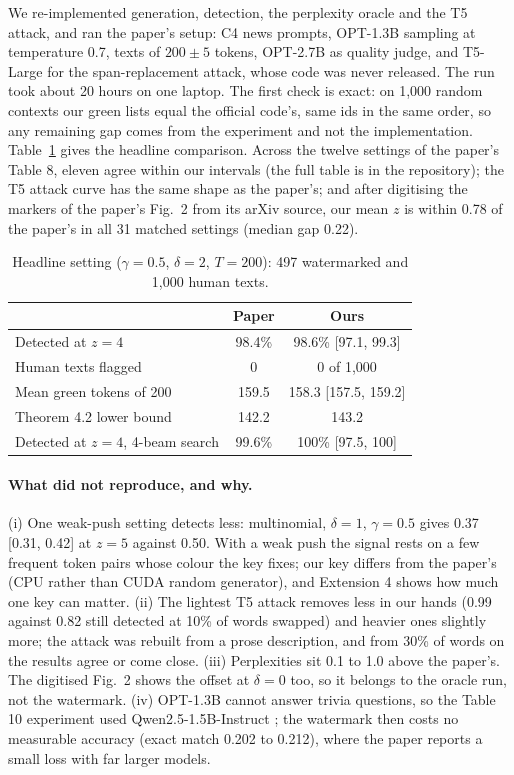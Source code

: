 \documentclass[12pt,letterpaper]{article}
\begin{document}
We re-implemented generation, detection, the perplexity oracle and the T5 attack, and ran the paper's setup: C4 news prompts, OPT-1.3B \citep{zhang2022opt} sampling at temperature 0.7, texts of $200 \pm 5$ tokens, OPT-2.7B as quality judge, and T5-Large \citep{raffel2020t5} for the span-replacement attack, whose code was never released. The run took about 20 hours on one laptop. The first check is exact: on 1,000 random contexts our green lists equal the official code's, same ids in the same order, so any remaining gap comes from the experiment and not the implementation. Table~\ref{tab:headline} gives the headline comparison. Across the twelve settings of the paper's Table 8, eleven agree within our intervals (the full table is in the repository); the T5 attack curve has the same shape as the paper's; and after digitising the markers of the paper's Fig.~2 from its arXiv source, our mean $z$ is within 0.78 of the paper's in all 31 matched settings (median gap 0.22).

\begin{table}[htbp]
\centering\singlespacing\small
\caption{Headline setting ($\gamma = 0.5$, $\delta = 2$, $T = 200$): 497 watermarked and 1,000 human texts.}
\label{tab:headline}
\begin{tabular}{lcc}
\toprule
 & Paper & Ours \\
\midrule
Detected at $z = 4$ & 98.4\% & 98.6\% [97.1, 99.3] \\
Human texts flagged & 0 & 0 of 1,000 \\
Mean green tokens of 200 & 159.5 & 158.3 [157.5, 159.2] \\
Theorem 4.2 lower bound & 142.2 & 143.2 \\
Detected at $z = 4$, 4-beam search & 99.6\% & 100\% [97.5, 100] \\
\bottomrule
\end{tabular}
\end{table}

\paragraph{What did not reproduce, and why.} (i) One weak-push setting detects less: multinomial, $\delta = 1$, $\gamma = 0.5$ gives 0.37 [0.31, 0.42] at $z = 5$ against 0.50. With a weak push the signal rests on a few frequent token pairs whose colour the key fixes; our key differs from the paper's (CPU rather than CUDA random generator), and Extension 4 shows how much one key can matter. (ii) The lightest T5 attack removes less in our hands (0.99 against 0.82 still detected at 10\% of words swapped) and heavier ones slightly more; the attack was rebuilt from a prose description, and from 30\% of words on the results agree or come close. (iii) Perplexities sit 0.1 to 1.0 above the paper's. The digitised Fig.~2 shows the offset at $\delta = 0$ too, so it belongs to the oracle run, not the watermark. (iv) OPT-1.3B cannot answer trivia questions, so the Table 10 experiment used Qwen2.5-1.5B-Instruct \citep{qwen2025}; the watermark then costs no measurable accuracy (exact match 0.202 to 0.212), where the paper reports a small loss with far larger models.
\end{document}
